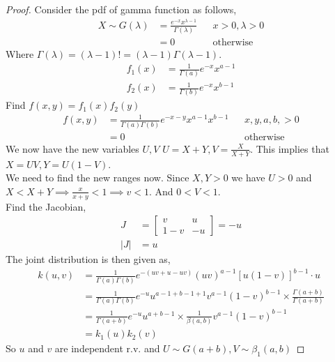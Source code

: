 \documentclass[oneside,11pt,pdftex]{book}%
\numberwithin{equation}{section}
\numberwithin{section}{chapter}
\numberwithin{equation}{chapter}
\begin{document}
\begin{proof}
	Consider the pdf of gamma function as follows,
	\begin{align*}
		X\sim G(\lambda)&= \frac{e^{-x} x^{\lambda -1}}{\Gamma (\lambda )} && x>0, \lambda >0\\
		&=0 && \text{otherwise}
	\end{align*}
	Where $ \Gamma (\lambda)=(\lambda-1)!=(\lambda-1)\Gamma (\lambda -1) $.\\
	\begin{align*}
		f_1(x)&=\frac{1}{\Gamma (a)}e^{-x}x^{a-1}\\
		f_2(x)&=\frac{1}{\Gamma (b)}e^{-x}x^{b-1}
	\end{align*}
	Find $ f(x,y)=f_1(x)f_2(y) $
		\begin{align*}
			f(x,y)&=\frac{1}{\Gamma(a)\Gamma(b)}e^{-x-y}x^{a-1}x^{b-1} && x,y,a,b,>0\\
			&= 0 && \text{otherwise}
		\end{align*}		
	We now have the new variables $ U,V $
	$ U=X+Y, V=\frac{X}{X+Y} $. This implies that $ X=UV, Y=U(1-V)$.\\
	We need to find the new ranges now. Since $ X,Y>0 $ we have $ U>0 $ and $ X<X+Y \implies \frac{x}{x+y}<1 \implies v<1 $. And $ 0<V<1 $.\\
	
	Find the Jacobian,
	\begin{align*}
		J&=\begin{bmatrix}
			v & u\\
			1-v & -u
		\end{bmatrix}=-u\\
	|J|&=u
	\end{align*}
	The joint distribution is then given as,
	\begin{align*}
			k(u,v)&=\frac{1}{\Gamma(a)\Gamma(b)}e^{-(uv+u-uv)}(uv)^{a-1}[u(1-v)]^{b-1} \cdot u\\
			&=\frac{1}{\Gamma(a)\Gamma(b)}e^{-u}u^{a-1+b-1+1} v^{a-1} (1-v)^{b-1} \times \frac{\Gamma(a+b)}{\Gamma(a+b)}\\
			&= \frac{1}{\Gamma(a+b)}e^{-u}u^{a+b-1} \times \frac{1}{\beta(a,b)}v^{a-1}(1-v)^{b-1}\\
			&=k_1(u)k_2(v)
	\end{align*}
So $ u $ and $ v $ are independent r.v. and $ U \sim G(a+b), V \sim \beta_1(a,b) $
\end{proof}
\end{document}
